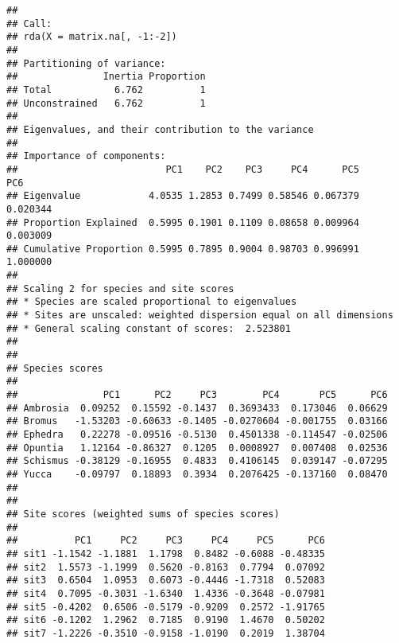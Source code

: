 \documentclass[
]{article}
\begin{document}
\begin{verbatim}
## 
## Call:
## rda(X = matrix.na[, -1:-2]) 
## 
## Partitioning of variance:
##               Inertia Proportion
## Total           6.762          1
## Unconstrained   6.762          1
## 
## Eigenvalues, and their contribution to the variance 
## 
## Importance of components:
##                          PC1    PC2    PC3     PC4      PC5      PC6
## Eigenvalue            4.0535 1.2853 0.7499 0.58546 0.067379 0.020344
## Proportion Explained  0.5995 0.1901 0.1109 0.08658 0.009964 0.003009
## Cumulative Proportion 0.5995 0.7895 0.9004 0.98703 0.996991 1.000000
## 
## Scaling 2 for species and site scores
## * Species are scaled proportional to eigenvalues
## * Sites are unscaled: weighted dispersion equal on all dimensions
## * General scaling constant of scores:  2.523801 
## 
## 
## Species scores
## 
##               PC1      PC2     PC3        PC4       PC5      PC6
## Ambrosia  0.09252  0.15592 -0.1437  0.3693433  0.173046  0.06629
## Bromus   -1.53203 -0.60633 -0.1405 -0.0270604 -0.001755  0.03166
## Ephedra   0.22278 -0.09516 -0.5130  0.4501338 -0.114547 -0.02506
## Opuntia   1.12164 -0.86327  0.1205  0.0008927  0.007408  0.02536
## Schismus -0.38129 -0.16955  0.4833  0.4106145  0.039147 -0.07295
## Yucca    -0.09797  0.18893  0.3934  0.2076425 -0.137160  0.08470
## 
## 
## Site scores (weighted sums of species scores)
## 
##          PC1     PC2     PC3     PC4     PC5      PC6
## sit1 -1.1542 -1.1881  1.1798  0.8482 -0.6088 -0.48335
## sit2  1.5573 -1.1999  0.5620 -0.8163  0.7794  0.07092
## sit3  0.6504  1.0953  0.6073 -0.4446 -1.7318  0.52083
## sit4  0.7095 -0.3031 -1.6340  1.4336 -0.3648 -0.07981
## sit5 -0.4202  0.6506 -0.5179 -0.9209  0.2572 -1.91765
## sit6 -0.1202  1.2962  0.7185  0.9190  1.4670  0.50202
## sit7 -1.2226 -0.3510 -0.9158 -1.0190  0.2019  1.38704
\end{verbatim}
\end{document}
